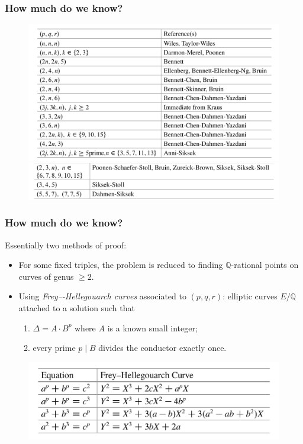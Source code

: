 \documentclass{beamer}
\newcommand{\QQ}{\mathbb{Q}}
\theoremstyle{plain}
\begin{document}
\begin{frame}
    \frametitle{How much do we know?}
    \begin{figure}
        \centering
        \includegraphics[scale=0.3]{known1.png}
        \includegraphics[scale=0.282]{known2.png}
    \end{figure}

\end{frame}

\begin{frame}
    \frametitle{How much do we know?}
    Essentially two methods of proof:
    \begin{itemize}
        \item For some fixed triples, the problem is reduced to finding $\QQ$-rational points on curves of genus $\geq2$.
        \item Using \textit{Frey–-Hellegouarch curves} associated to $(p,q,r)$: elliptic curves $E/\QQ$ attached to a solution such that
        \begin{enumerate}
            \item $\Delta=A\cdot B^p$ where $A$ is a known small integer;
            \item every prime $p\mid B$ divides the conductor exactly once.
        \end{enumerate}
    \end{itemize}
    \begin{figure}
        \centering
        \includegraphics[scale=0.4]{fh_curves.png}
    \end{figure}
    
\end{frame}
\end{document}
